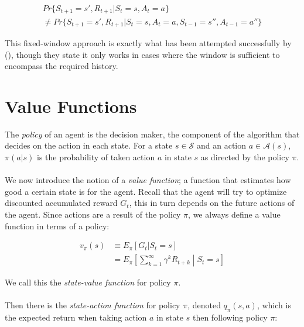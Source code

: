\begin{equation}
\begin{split}
Pr\{S_{t+1}=s', R_{t+1}| S_t = s, A_t = a\} \\
\neq Pr\{S_{t+1}=s', R_{t+1}| S_t = s, A_t = a, S_{t-1} = s'', A_{t-1}=a''\}
\end{split}
\end{equation}

This fixed-window approach is exactly what has been attempted successfully by
\citeauthor{Lin1992a} (\citeyear{Lin1992a}),
though they state it only works in cases
where the window is sufficient to encompass the required history.

\section{Value Functions}
The \textit{policy} of an agent is the decision maker,
the component of the algorithm that decides on the action in each state.
For a state $s \in \mathcal{S}$
and an action $a \in \mathcal{A}(s)$,
$\pi(a|s)$ is the probability of taken action $a$ in state $s$
as directed by the policy $\pi$.

\paragraph{}
We now introduce the notion of a \textit{value function};
a function that estimates how good a certain state is for the agent.
Recall that the agent will try to optimize discounted accumulated reward $G_t$,
this in turn depends on the future actions of the agent.
Since actions are a result of the policy $\pi$,
we always define a value function in terms of a policy:

\begin{equation}
  \begin{split}
    v_\pi(s) &\equiv E_\pi[G_t | S_t = s] \\
    &= E_\pi \left[ \sum^\infty_{k=1}\gamma^kR_{t+k} \middle| S_t = s \right]
  \end{split}
\end{equation}

We call this the \textit{state-value function} for policy $\pi$.

\paragraph{}
Then there is the \textit{state-action function} for policy $\pi$,
denoted $q_\pi(s,a)$,
which is the expected return when taking action $a$ in state $s$
then following policy $\pi$:

